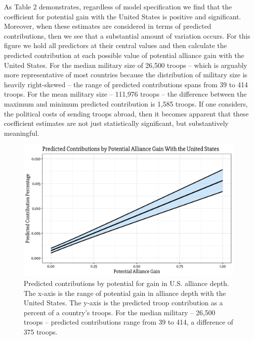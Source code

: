 \documentclass[12pt,letterpaper]{article}
\begin{document}
		

		As Table 2 demonstrates, regardless of model specification we find that the coefficient for potential gain with the United States is positive and significant. Moreover, when these estimates are considered in terms of predicted contributions, then we see that a substantial amount of variation occurs. For this figure we hold all predictors at their central values and then calculate the predicted contribution at each possible value of potential alliance gain with the United States. For the median military size of 26,500 troops -- which is arguably more representative of most countries because the distribution of military size is heavily right-skewed -- the range of predicted contributions spans from 39 to 414 troops. For the mean military size -- 111,976 troops -- the difference between the maximum and minimum predicted contribution is 1,585 troops. If one considers, the political costs of sending troops abroad, then it becomes apparent that these coefficient estimates are not just statistically significant, but substantively meaningful.
	
		\begin{figure}[ht]
			\centering
			\includegraphics[scale = 0.75]{figures/pred_contr.pdf}
			\caption{Predicted contributions by potential for gain in U.S. alliance depth. The x-axis is the range of potential gain in alliance depth with the United States. The y-axis is the predicted troop contribution as a percent of a country's troops. For the median military -- 26,500 troops -- predicted contributions range from 39 to 414, a difference of 375 troops.}
		\end{figure}
\end{document}
